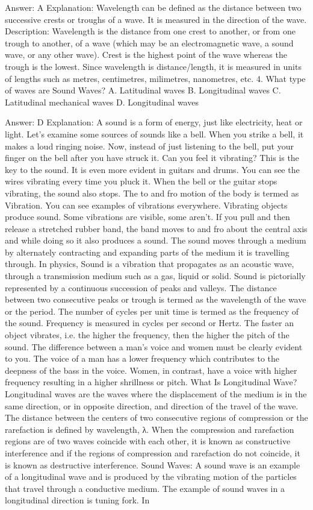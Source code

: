 Answer: A
Explanation: Wavelength can be defined as the distance between two successive crests or troughs of a wave. It is measured in the direction of the wave. Description: Wavelength is the distance from one crest to another, or from one trough to another, of a wave (which may be an electromagnetic wave, a sound wave, or any other wave). Crest is the highest point of the wave whereas the trough is the lowest. Since wavelength is distance/length, it is measured in units of lengths such as metres, centimetres, milimetres, nanometres, etc. 4. What type of waves are Sound Waves? A. Latitudinal waves B. Longitudinal waves C. Latitudinal mechanical waves D. Longitudinal waves 

Answer: D
Explanation: A sound is a form of energy, just like electricity, heat or light. Let’s examine some sources of sounds like a bell. When you strike a bell, it makes a loud ringing noise. Now, instead of just listening to the bell, put your finger on the bell after you have struck it. Can you feel it vibrating? This is the key to the sound. It is even more evident in guitars and drums. You can see the wires vibrating every time you pluck it. When the bell or the guitar stops vibrating, the sound also stops. The to and fro motion of the body is termed as Vibration. You can see examples of vibrations everywhere. Vibrating objects produce sound. Some vibrations are visible, some aren’t. If you pull and then release a stretched rubber band, the band moves to and fro about the central axis and while doing so it also produces a sound. The sound moves through a medium by alternately contracting and expanding parts of the medium it is travelling through. In physics, Sound is a vibration that propagates as an acoustic wave, through a transmission medium such as a gas, liquid or solid. Sound is pictorially represented by a continuous succession of peaks and valleys. The distance between two consecutive peaks or trough is termed as the wavelength of the wave or the period. The number of cycles per unit time is termed as the frequency of the sound. Frequency is measured in cycles per second or Hertz. The faster an object vibrates, i.e. the higher the frequency, then the higher the pitch of the sound. The difference between a man’s voice and women must be clearly evident to you. The voice of a man has a lower frequency which contributes to the deepness of the bass in the voice. Women, in contrast, have a voice with higher frequency resulting in a higher shrillness or pitch. What Is Longitudinal Wave? Longitudinal waves are the waves where the displacement of the medium is in the same direction, or in opposite direction, and direction of the travel of the wave. The distance between the centers of two consecutive regions of compression or the rarefaction is defined by wavelength, λ. When the compression and rarefaction regions are of two waves coincide with each other, it is known as constructive interference and if the regions of compression and rarefaction do not coincide, it is known as destructive interference. Sound Waves: A sound wave is an example of a longitudinal wave and is produced by the vibrating motion of the particles that travel through a conductive medium. The example of sound waves in a longitudinal direction is tuning fork. In 